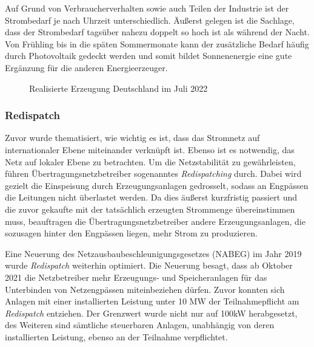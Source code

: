 \documentclass[12pt, a4paper]{article}
\begin{document}
Auf Grund von Verbraucherverhalten sowie auch Teilen der Industrie ist der Strombedarf je nach Uhrzeit unterschiedlich. Äußerst gelegen ist die Sachlage, dass der Strombedarf tagsüber nahezu doppelt so hoch ist als während der Nacht. Von Frühling bis in die späten Sommermonate kann der zusätzliche Bedarf häufig durch Photovoltaik gedeckt werden und somit bildet Sonnenenergie eine gute Ergänzung für die anderen Energieerzeuger. 


\begin{figure}
\centering
\def\svgwidth{450pt}
\fontsize{7}{10}\selectfont

\caption{Realisierte Erzeugung Deutschland im Juli 2022}
\label{fig:stromerzeugung_de_mai}
\end {figure}

\subsubsection{Redispatch}

Zuvor wurde thematisiert, wie wichtig es ist, dass das Stromnetz auf internationaler Ebene miteinander verknüpft ist. Ebenso ist es notwendig, das Netz auf lokaler Ebene zu betrachten. Um die Netzstabilität zu gewährleisten, führen Übertragungsnetzbetreiber sogenanntes \textit{Redispatching} durch. Dabei wird gezielt die Einspeisung durch Erzeugungsanlagen gedrosselt, sodass an Engpässen die Leitungen nicht überlastet werden. Da dies äußerst kurzfristig passiert und die zuvor gekaufte mit der tatsächlich erzeugten Strommenge übereinstimmen muss, beauftragen die Übertragungsnetzbetreiber andere Erzeugungsanlagen, die sozusagen hinter den Engpässen liegen, mehr Strom zu produzieren.

Eine Neuerung des Netzausbaubeschleunigungsgesetzes (NABEG) im Jahr 2019 wurde \textit{Redispatch} weiterhin optimiert. Die Neuerung besagt, dass ab Oktober 2021 die Netzbetreiber mehr Erzeugungs- und Speicheranlagen für das Unterbinden von Netzengpässen miteinbeziehen dürfen. Zuvor konnten sich Anlagen mit einer installierten Leistung unter 10 MW der Teilnahmepflicht am \textit{Redispatch} entziehen. Der Grenzwert wurde nicht nur auf 100kW herabgesetzt, des Weiteren sind sämtliche steuerbaren Anlagen, unabhängig von deren installierten Leistung, ebenso an der Teilnahme verpflichtet.

\end{document}
